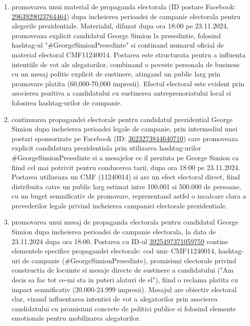 \documentclass[a4paper,12pt]{article}
\begin{document}
\begin{enumerate}[leftmargin=*, label=\arabic*.)]
    \item promovarea unui material de propaganda electorala (ID postare Facebook: \href{https://www.facebook.com/ads/library/?id=2963929023764464}{2963929023764464}) dupa incheierea perioadei de campanie electorala pentru alegerile prezidentiale. Materialul, difuzat dupa ora 18:00 pe 23.11.2024, promoveaza explicit candidatul George Simion la presedintie, folosind hashtag-ul "\#GeorgeSimionPresedinte" si continand numarul oficial de material electoral CMF11240014. Postarea este structurata pentru a influenta intentiile de vot ale alegatorilor, combinand o poveste personala de business cu un mesaj politic explicit de sustinere, atingand un public larg prin promovare platita (60,000-70,000 impresii). Efectul electoral este evident prin asocierea pozitiva a candidatului cu sustinerea antreprenoriatului local si folosirea hashtag-urilor de campanie.
    \item continuarea propagandei electorale pentru candidatul prezidential George Simion dupa incheierea perioadei legale de campanie, prin intermediul unei postari sponsorizate pe Facebook (ID: \href{https://www.facebook.com/ads/library/?id=3623273844640710}{3623273844640710}) care promoveaza explicit candidatura prezidentiala prin utilizarea hashtag-urilor \#GeorgeSimionPresedinte si a mesajelor ce il prezinta pe George Simion ca fiind cel mai potrivit pentru conducerea tarii, dupa ora 18:00 pe 23.11.2024. Postarea utilizeaza un CMF (11240014) si are un efect electoral direct, fiind distribuita catre un public larg estimat intre 100.001 si 500.000 de persoane, cu un buget semnificativ de promovare, reprezentand astfel o incalcare clara a prevederilor legale privind incheierea campaniei electorale prezidentiale.
    \item promovarea unui mesaj de propaganda electorala pentru candidatul George Simion dupa incheierea perioadei de campanie electorala, la data de 23.11.2024 dupa ora 18:00. Postarea cu ID-ul \href{https://www.facebook.com/ads/library/?id=3925497371059759}{3925497371059759} contine elementele specifice propagandei electorale: cod unic CMF11240014, hashtag-uri de campanie (\#GeorgeSimionPresedinte), promisiuni electorale privind constructia de locuinte si mesaje directe de sustinere a candidatului ("Am decis sa fac tot ce-mi sta in puteri alaturi de el"), fiind o reclama platita cu impact semnificativ (20.000-24.999 impresii). Mesajul are obiectiv electoral clar, vizand influentarea intentiei de vot a alegatorilor prin asocierea candidatului cu promisiuni concrete de politici publice si folosind elemente emotionale pentru mobilizarea alegatorilor.

\end{enumerate}
\end{document}
